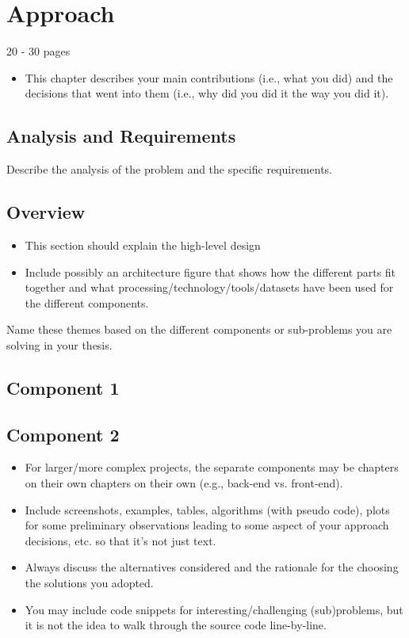 \chapter{Approach}
\label{ch:approach}
20 - 30 pages
\begin{itemize}
    \item This chapter describes your main contributions (i.e., what you did) and the decisions that went into them (i.e., why did you did it the way you did it).
    
\end{itemize}
\section{Analysis and Requirements}
Describe the analysis of the problem and the specific requirements.

\section{Overview}
\begin{itemize}
    \item This section should explain the high-level design
    \item Include possibly an architecture figure that shows how the different parts fit together and what processing/technology/tools/datasets have been used for the different components.
\end{itemize}
    
    Name these themes based on the different components or sub-problems you are solving in your thesis.
    
    \section{Component 1}
    \section{Component 2}
    
    \begin{itemize}
    \item For larger/more complex projects, the separate components may be chapters on their own chapters on their own (e.g., back-end vs. front-end).
    \item Include screenshots, examples, tables, algorithms (with pseudo code), plots for some preliminary observations leading to some aspect of your approach decisions, etc. so that it's not just text.
    \item Always discuss the alternatives considered and the rationale for the choosing the solutions you adopted.
    \item You may include code snippets for interesting/challenging (sub)problems, but it is not the idea to walk through the source code line-by-line.
\end{itemize}
    